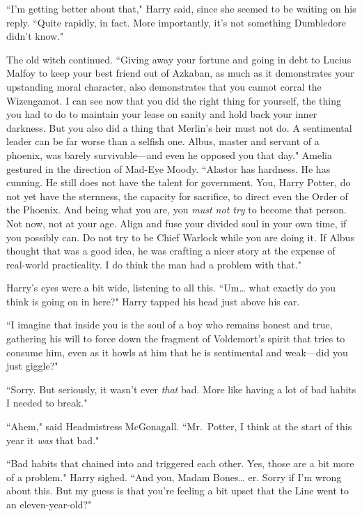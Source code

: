 ``I'm getting better about that," Harry said, since she seemed to be waiting on his reply. ``Quite rapidly, in fact. More importantly, it's not something Dumbledore didn't know."

The old witch continued. ``Giving away your fortune and going in debt to Lucius Malfoy to keep your best friend out of Azkaban, as much as it demonstrates your upstanding moral character, also demonstrates that you cannot corral the Wizengamot. I can see now that you did the right thing for yourself, the thing you had to do to maintain your lease on sanity and hold back your inner darkness. But you also did a thing that Merlin's heir must not do. A sentimental leader can be far worse than a selfish one. Albus, master and servant of a phoenix, was barely survivable---and even he opposed you that day." Amelia gestured in the direction of Mad-Eye Moody. ``Alastor has hardness. He has cunning. He still does not have the talent for government. You, Harry Potter, do not yet have the sternness, the capacity for sacrifice, to direct even the Order of the Phoenix. And being what you are, you \emph{must not try} to become that person. Not now, not at your age. Align and fuse your divided soul in your own time, if you possibly can. Do not try to be Chief Warlock while you are doing it. If Albus thought that was a good idea, he was crafting a nicer story at the expense of real-world practicality. I do think the man had a problem with that."

Harry's eyes were a bit wide, listening to all this. ``Um{\ldots} what exactly do you think is going on in here?" Harry tapped his head just above his ear.

``I imagine that inside you is the soul of a boy who remains honest and true, gathering his will to force down the fragment of Voldemort's spirit that tries to consume him, even as it howls at him that he is sentimental and weak---did you just giggle?"

``Sorry. But seriously, it wasn't ever \emph{that} bad. More like having a lot of bad habits I needed to break."

``Ahem," said Headmistress McGonagall. ``Mr.~Potter, I think at the start of this year it \emph{was} that bad."

``Bad habits that chained into and triggered each other. Yes, those are a bit more of a problem." Harry sighed. ``And you, Madam Bones{\ldots} er. Sorry if I'm wrong about this. But my guess is that you're feeling a bit upset that the Line went to an eleven-year-old?"

